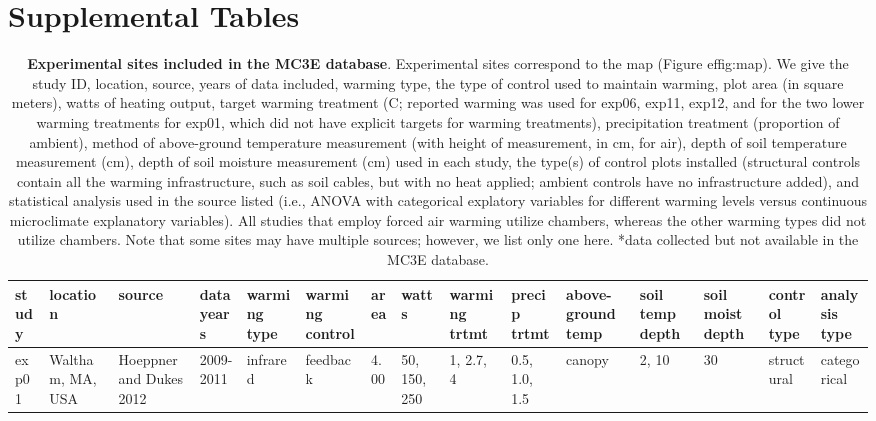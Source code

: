 \documentclass{article}
\begin{document}
\section* {Supplemental Tables} 
\begin{landscape}
\begin{footnotesize} 
\begin{table}[ht]
\centering
\caption{\textbf{Experimental sites included in the MC3E database}. Experimental sites correspond to the map (Figure 
ef{fig:map}). We give the study ID, location, source, years of data included, warming type, the type of control used to maintain warming, plot area (in square meters), watts of heating output, target warming treatment (\degree C; reported warming was used for exp06, exp11, exp12, and for the two lower warming treatments for exp01, which did not have explicit targets for warming treatments), precipitation treatment (proportion of ambient), method of above-ground temperature measurement (with height of measurement, in cm, for air), depth of soil temperature measurement (cm), depth of soil moisture measurement (cm) used in each study, the type(s) of control plots installed (structural controls contain all the warming infrastructure, such as soil cables, but with no heat applied; ambient controls have no infrastructure added), and statistical analysis used in the source listed (i.e., ANOVA with categorical explatory variables for different warming levels versus continuous microclimate explanatory variables). All studies that employ forced air warming utilize chambers, whereas the other warming types did not utilize chambers. Note that some sites may have multiple sources; however, we list only one here. *data collected but not available in the MC3E database.} 
\label{tab:methods}
\begingroup\footnotesize
\begin{tabular}{|p{}|p{}|p{}|p{}|p{}|p{}|p{}|p{}|p{}|p{}|p{}|p{}|p{}|p{}|p{}|}
  \hline
study & location & source & data years & warming type & warming control & area & watts & warming trtmt & precip trtmt & above-ground temp & soil temp depth & soil moist depth & control type & analysis type \\ 
  \hline
exp01 & Waltham, MA, USA & Hoeppner and Dukes 2012 & 2009-2011 & infrared & feedback & 4.00 & 50, 150, 250 & 1, 2.7, 4 & 0.5, 1.0, 1.5 & canopy & 2, 10 & 30 & structural & categorical \\ 

\end{tabular}
\end{table}
\end{footnotesize}
\end{landscape}
\end{document}

